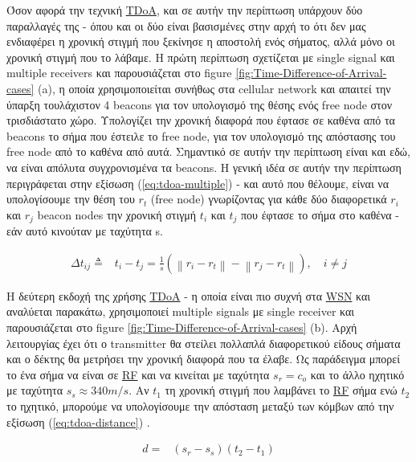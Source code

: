 Όσον αφορά την τεχνική \hyperref[abbr:TDoA]{TDoA}, και σε αυτήν την περίπτωση υπάρχουν δύο παραλλαγές της \cite{wsn-Localization-systems} - όπου και οι 
δύο είναι βασισμένες στην αρχή το ότι δεν μας ενδιαφέρει η χρονική στιγμή που ξεκίνησε η αποστολή ενός σήματος, αλλά μόνο
οι χρονική στιγμή που το λάβαμε.
Η πρώτη περίπτωση σχετίζεται με single signal και multiple receivers και παρουσιάζεται στο 
figure \ref{fig:Time-Difference-of-Arrival-cases} (a), 
η οποία χρησιμοποιείται συνήθως στα cellular network και απαιτεί την ύπαρξη 
τουλάχιστον 4 beacons για τον υπολογισμό της θέσης ενός free node στον τρισδιάστατο χώρο. Υπολογίζει την χρονική διαφορά
που έφτασε σε καθένα από τα beacons το σήμα που έστειλε το free node, για τον υπολογισμό της απόστασης του free node από
το καθένα από αυτά. Σημαντικό σε αυτήν την περίπτωση είναι και εδώ, να είναι απόλυτα συγχρονισμένα τα beacons. 
Η γενική ιδέα σε αυτήν την περίπτωση περιγράφεται στην εξίσωση (\ref{eq:tdoa-multiple}) \cite{wsn-Localization-techniques} \cite{simple-tdoa} - και αυτό που 
θέλουμε, είναι να υπολογίσουμε την θέση του $r_t$ (free node) γνωρίζοντας για κάθε δύο διαφορετικά $r_i$ και $r_j$ beacon nodes
την χρονική στιγμή $t_i$ και $t_j$ που έφτασε το σήμα στο καθένα - εάν αυτό κινούταν με ταχύτητα s. 

\newcommand{\norm}[1]{\left\lVert#1\right\rVert}
\begin{align}
	\Delta t_{ij} \triangleq & t_i - t_j = \frac{1}{s} (\norm{r_i - r_t} - \norm{r_j - r_t}), \quad i \neq j\label{eq:tdoa-multiple}
\end{align}

Η δεύτερη εκδοχή της χρήσης \hyperref[abbr:TDoA]{TDoA} - η οποία είναι πιο συχνή στα \hyperref[abbr:WSN]{WSN} και αναλύεται παρακάτω, 
χρησιμοποιεί multiple signals με single receiver και παρουσιάζεται στο figure \ref{fig:Time-Difference-of-Arrival-cases} (b). 
Αρχή λειτουργίας έχει ότι ο transmitter θα στείλει πολλαπλά διαφορετικού είδους σήματα και ο δέκτης θα μετρήσει την χρονική διαφορά 
που τα έλαβε. Ως παράδειγμα μπορεί το ένα σήμα να είναι σε \hyperref[abbr:RF]{RF} και να κινείται με ταχύτητα $s_r=c_o$ και το άλλο 
ηχητικό με ταχύτητα $s_s \approx 340m/s$. Αν $t_1$ τη χρονική στιγμή που λαμβάνει το \hyperref[abbr:RF]{RF} σήμα ενώ $t_2$ το ηχητικό,
μπορούμε να υπολογίσουμε την απόσταση μεταξύ των κόμβων από την εξίσωση (\ref{eq:tdoa-distance})
\cite{wsn-Localization-systems}.

\begin{align}
	d=&(s_r-s_s)(t_2-t_1) \label{eq:tdoa-distance}
\end{align}

